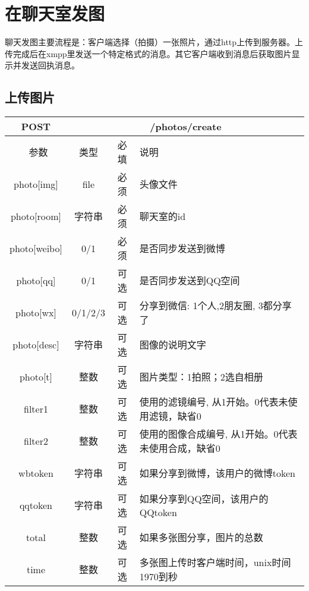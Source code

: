 
\section{在聊天室发图}
聊天发图主要流程是：客户端选择（拍摄）一张照片，通过http上传到服务器。上传完成后在xmpp里发送一个特定格式的消息。其它客户端收到消息后获取图片显示并发送回执消息。

\subsection{上传图片}

\begin{table}[H]
   \begin{center}
\begin{tabular}{|c|c|c|p{12cm}|}
\hline
POST & \multicolumn{3}{|c|}{/photos/create} \\
\hline\hline
 \  参数  & 类型 & 必填 &  说明  \\
\hline
 photo[img]  & file & 必须 &  头像文件\\
 \hline
 photo[room]  & 字符串 & 必须  &  聊天室的id\\
 \hline
 photo[weibo]  & 0/1 & 必须  &  是否同步发送到微博\\
  \hline
 photo[qq]  & 0/1 & 可选  &  是否同步发送到QQ空间\\
   \hline
 photo[wx]  & 0/1/2/3 & 可选  &  分享到微信: 1个人,2朋友圈, 3都分享了\\
   \hline
 photo[desc]  & 字符串 & 可选  &  图像的说明文字\\
 \hline
  photo[t]  & 整数 & 可选 &  图片类型：1拍照；2选自相册\\
 \hline
  filter1  & 整数 & 可选 &  使用的滤镜编号, 从1开始。0代表未使用滤镜，缺省0\\
 \hline
  filter2  & 整数 & 可选 &  使用的图像合成编号, 从1开始。0代表未使用合成，缺省0\\  
 \hline
 wbtoken  & 字符串 & 可选  &  如果分享到微博，该用户的微博token\\
  \hline
 qqtoken  & 字符串 & 可选  &  如果分享到QQ空间，该用户的QQtoken\\
 \hline
  total  & 整数 & 可选  &  如果多张图分享，图片的总数\\
 \hline
  time  & 整数 & 可选  &  多张图上传时客户端时间，unix时间1970到秒\\  
 \hline
\end{tabular}
   \end{center}
\end{table}

